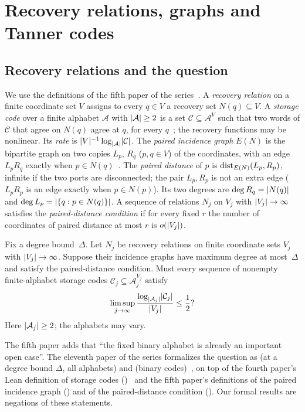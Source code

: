 \section{Recovery relations, graphs and Tanner codes}\label{sec:prelim}

\subsection{Recovery relations and the question}\label{sec:prelim-question}

We use the definitions of the fifth paper of the series~\cite[Section~2]{DirectedRecovery2026}. A \emph{recovery
relation} on a finite coordinate set $V$ assigns to every $q\in V$ a recovery set $N(q)\subseteq V$. A \emph{storage code}
over a finite alphabet $\mathcal A$ with $\lvert \mathcal A \rvert\ge2$ is a set $\mathcal C\subseteq\mathcal A^V$ such that two
words of $\mathcal C$ that agree on $N(q)$ agree at $q$, for every $q$~\cite[Definition~2.1]{DirectedRecovery2026}; the
recovery functions may be nonlinear. Its \emph{rate} is $\lvert V \rvert^{-1}\log_{\lvert \mathcal A \rvert}\lvert \mathcal C \rvert$.
The \emph{paired incidence graph} $E(N)$ is the bipartite graph on two copies $L_p$, $R_q$ ($p,q\in V$) of the
coordinates, with an edge $L_pR_q$ exactly when $p\in N(q)$~\cite[Definition~2.3]{DirectedRecovery2026}. The
\emph{paired distance} of $p$ is $\operatorname{dist}_{E(N)}(L_p,R_p)$, infinite if the two ports are disconnected; the pair
$L_p,R_p$ is not an extra edge ($L_pR_p$ is an edge exactly when $p\in N(p)$). Its two degrees are $\deg R_q=\lvert N(q) \rvert$ and $\deg L_p=\lvert \{q:p\in N(q)\} \rvert$. A sequence
of relations $N_j$ on $V_j$ with $\lvert V_j \rvert\to\infty$ satisfies the \emph{paired-distance condition} if for every fixed
$r$ the number of coordinates of paired distance at most $r$ is $o(\lvert V_j \rvert)$.

\begin{question}\label{prob:q91}
Fix a degree bound~$\Delta$. Let $N_j$ be recovery relations on finite coordinate sets $V_j$ with $\lvert V_j \rvert\to\infty$.
Suppose their incidence graphs have maximum degree at most~$\Delta$ and satisfy the paired-distance condition. Must
every sequence of nonempty finite-alphabet storage codes $\mathcal C_j\subseteq\mathcal A_j^{V_j}$ satisfy
\[
  \limsup_{j\to\infty}\frac{\log_{\lvert \mathcal A_j \rvert}\lvert \mathcal C_j \rvert}{\lvert V_j \rvert}\le\frac12?
\]
Here $\lvert \mathcal A_j \rvert\ge2$; the alphabets may vary.
\end{question}

The fifth paper adds that ``the fixed binary alphabet is already an important open case''. The eleventh paper of the
series formalizes the question as  (at a degree bound $\Delta$, all alphabets) and
 (binary codes)~\cite{MergeDepth2026}, on top of the fourth paper's Lean definition of
storage codes ()~\cite{CurvedMotion2026} and the fifth paper's definitions of the
paired incidence graph () and of the paired-distance condition
(). Our formal
results are negations of these statements.


